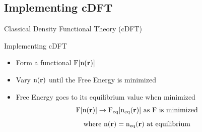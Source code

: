 \documentclass{beamer}
\renewcommand{\vec}[1]{\mathbf{#1}}
\begin{document}
\subsection{Implementing cDFT}
\begin{frame}{Classical Density Functional Theory (cDFT)}
    \begin{block}{Implementing cDFT}
    \begin{itemize}
       \item Form a functional $\text F[\text n(\vec r)]$  \checkmark
       \item Vary $\text n(\vec{r})$ until the Free Energy is minimized %
       
       \item Free Energy goes to its equilibrium value when minimized      
       \begin{displaymath}\text F[\text n(\vec r)]\rightarrow \text F_{\text{eq}}[\text n_{\text{eq}}(\vec r)]  \mbox{ as F is minimized} \end{displaymath}
       \begin{displaymath}{\mbox{where }  \text n(\vec{r}) = \text n_{\text{eq}}(\vec r)  \mbox{ at equilibrium}}\end{displaymath}              
       
     \end{itemize} 
     \end{block}
\end{frame}
\end{document}
